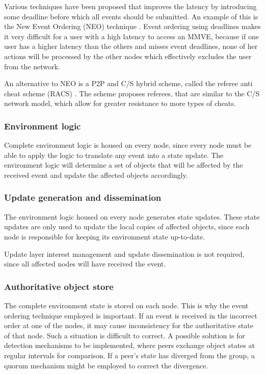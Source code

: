 Various techniques have been proposed that improves the latency by introducing some deadline before which all events should be submitted. An example of this is the New Event Ordering (NEO) technique \cite{cheat_proof_event_ordering}. Event ordering using deadlines makes it very difficult for a user with a high latency to access an MMVE, because if one user has a higher latency than the others and misses event deadlines, none of her actions will be processed by the other nodes which effectively excludes the user from the network.

An alternative to NEO is a P2P and C/S hybrid scheme, called the referee anti cheat scheme (RACS) \cite{cheating_taxonomy}. The scheme proposes referees, that are similar to the C/S network model, which allow for greater resistance to more types of cheats.

\subsubsection{Environment logic}
Complete environment logic is housed on every node, since every node must be able to apply the logic to translate any event into a state update. The environment logic will determine a set of objects that will be affected by the received event and update the affected objects accordingly.

\subsubsection{Update generation and dissemination}

The environment logic housed on every node generates state updates. These state updates are only used to update the local copies of affected objects, since each node is responsible for keeping its environment state up-to-date.

Update layer interest management and update dissemination is not required, since all affected nodes will have received the event.

\subsubsection{Authoritative object store}

The complete environment state is stored on each node. This is why the event ordering technique employed is important. If an event is received in the incorrect order at one of the nodes, it may cause inconsistency for the authoritative state of that node. Such a situation is difficult to correct. A possible solution is for detection mechanisms to be implemented, where peers exchange object states at regular intervals for comparison. If a peer's state has diverged from the group, a quorum mechanism might be employed to correct the divergence.

